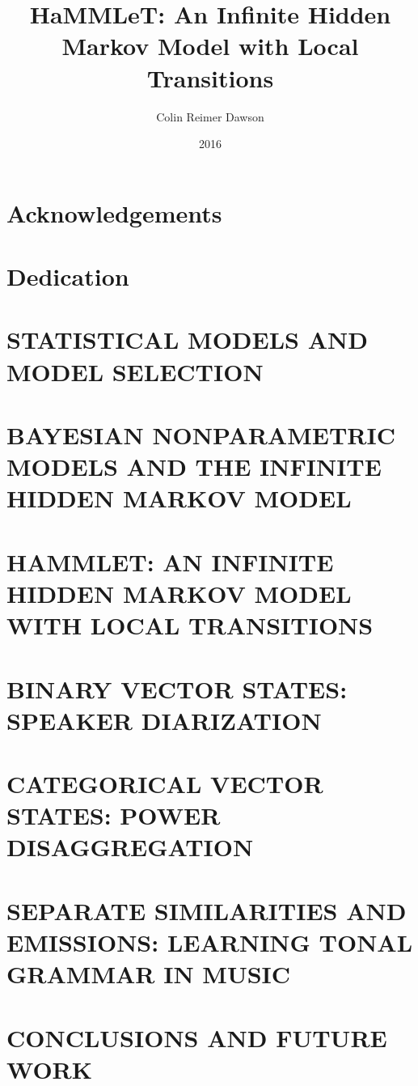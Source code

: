 \documentclass[final]{ua-thesis}
\title{{HaMMLeT}: An Infinite Hidden Markov Model with Local
  Transitions}
\author{Colin Reimer Dawson}
\date{2016}
\begin{document}
% 
\maketitle



\chapter*{Acknowledgements}
\begin{singlespace}

\end{singlespace}

\chapter*{Dedication}


\tableofcontents
\listoftables
\listoffigures
\begin{abstract}

\end{abstract}

\chapter{ \MakeUppercase{Statistical Models and Model Selection} }
\label{chapter:intro}



\chapter{ \MakeUppercase{Bayesian Nonparametric Models and the Infinite
  Hidden Markov Model} }
\label{chapter:HMM-NPBayes}


\chapter{\MakeUppercase{HaMMLeT: An infinite Hidden Markov Model with
    Local Transitions}}
\label{chapter:HaMMLeT}


\chapter{\MakeUppercase{Binary Vector States: Speaker Diarization}}
\label{chapter:cocktail-party}


\chapter{\MakeUppercase{Categorical Vector States: Power Disaggregation}}
\label{chapter:REDD}


\chapter{\MakeUppercase{Separate Similarities and Emissions: Learning
  Tonal Grammar in Music}}
\label{chapter:music}


\chapter{\MakeUppercase{Conclusions and Future Work}}
\label{chapter:discussion}




\end{document}
